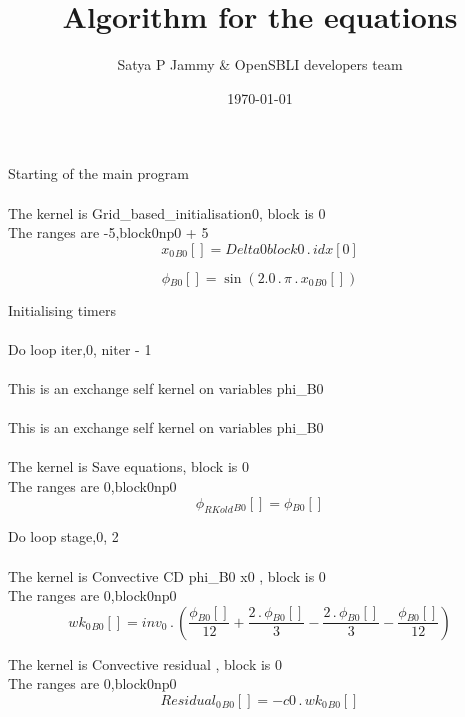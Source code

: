 \documentclass{article}
\title{Algorithm for the equations}
\author{Satya P Jammy \& OpenSBLI developers team}
\date{\today}
\begin{document}
\maketitle
\noindent Starting of the main program\\
\\\noindent The kernel is Grid_based_initialisation0, block is 0\\\noindent The ranges are -5,block0np0 + 5\\\begin{dmath}{x_{0}{_{B0}}}[{}] = Delta0block0 \,.\, {idx}[{0}]\end{dmath}

\begin{dmath}{\phi{_{B0}}}[{}] = \sin{\left (2.0 \,.\, \pi \,.\, {x_{0}{_{B0}}}[{}] \right )}\end{dmath}

\noindent Initialising timers\\
\\\noindent Do loop iter,0, niter - 1\\
\\\noindent This is an exchange self kernel on variables phi_B0\\\\\noindent This is an exchange self kernel on variables phi_B0\\\\\noindent The kernel is Save equations, block is 0\\\noindent The ranges are 0,block0np0\\\begin{dmath}{\phi_{RKold}{_{B0}}}[{}] = {\phi{_{B0}}}[{}]\end{dmath}

\noindent Do loop stage,0, 2\\
\\\noindent The kernel is Convective CD phi_B0 x0 , block is 0\\\noindent The ranges are 0,block0np0\\\begin{dmath}{wk_{0}{_{B0}}}[{}] = inv_0 \,.\, \left(\frac{{\phi{_{B0}}}[{}]}{12} + \frac{2 \,.\, {\phi{_{B0}}}[{}]}{3} - \frac{2 \,.\, {\phi{_{B0}}}[{}]}{3} - \frac{{\phi{_{B0}}}[{}]}{12}\right)\end{dmath}

\noindent The kernel is Convective residual , block is 0\\\noindent The ranges are 0,block0np0\\\begin{dmath}{Residual_{0}{_{B0}}}[{}] = - c0 \,.\, {wk_{0}{_{B0}}}[{}]\end{dmath}
\end{document}
